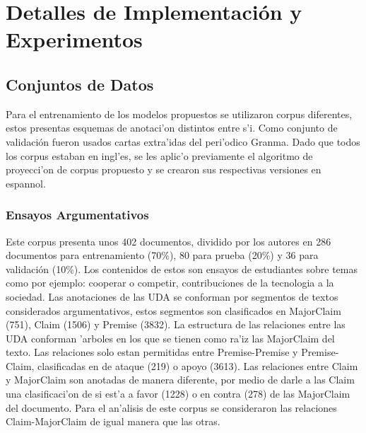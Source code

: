 \chapter{Detalles de Implementación y Experimentos}\label{chapter:implementation}


\section{Conjuntos de Datos}

Para el entrenamiento de los modelos propuestos se utilizaron corpus diferentes, estos
presentas esquemas de anotaci'on distintos entre s'i. Como conjunto de validación fueron
usados cartas extra'idas del peri'odico Granma. Dado que todos los corpus estaban en ingl'es, 
se les aplic'o previamente el algoritmo de proyecci'on de corpus propuesto y se crearon sus respectivas
versiones en espannol.

\subsection{Ensayos Argumentativos}\label{corpus:persuasive_essays}

Este corpus presenta unos 402 documentos, dividido por los autores en 286 documentos para entrenamiento (70\%), 
80 para prueba (20\%) y 36 para validación (10\%). Los contenidos de estos son ensayos de estudiantes sobre temas
como por ejemplo: cooperar o competir, contribuciones de la tecnologia a la sociedad.
Las anotaciones de las UDA se conforman por segmentos 
de textos considerados argumentativos, estos segmentos son clasificados en MajorClaim (751), Claim (1506) y Premise (3832).
La estructura de las relaciones entre las UDA conforman 'arboles en los que se tienen como ra'iz las 
MajorClaim del texto. Las relaciones solo estan permitidas entre Premise-Premise y Premise-Claim, clasificadas
en de ataque (219) o apoyo (3613). Las relaciones entre Claim y MajorClaim son anotadas de manera diferente, por medio de 
darle a las Claim una clasificaci'on de si est'a a favor (1228) o en contra (278) de las MajorClaim del documento.
Para el an'alisis de este corpus se consideraron las relaciones Claim-MajorClaim de igual manera que las otras.

